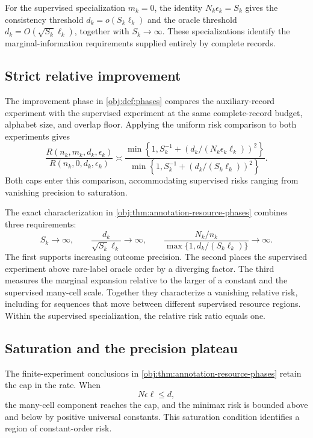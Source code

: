 For the supervised specialization \(m_k=0\), the identity \(N_k\epsilon_k=S_k\) gives the consistency threshold \(d_k=o(S_k\ell_k)\) and the oracle threshold \(d_k=O(\sqrt{S_k}\ell_k)\), together with \(S_k\to\infty\). These specializations identify the marginal-information requirements supplied entirely by complete records.

\subsection{Strict relative improvement}

The improvement phase in \cref{obj:def:phases} compares the auxiliary-record experiment with the supervised experiment at the same complete-record budget, alphabet size, and overlap floor. Applying the uniform risk comparison to both experiments gives
\[
\frac{R(n_k,m_k,d_k,\epsilon_k)}
     {R(n_k,0,d_k,\epsilon_k)}
\asymp
\frac{
\min\left\{1,S_k^{-1}
+\left(d_k/(N_k\epsilon_k\ell_k)\right)^2\right\}
}{
\min\left\{1,S_k^{-1}
+\left(d_k/(S_k\ell_k)\right)^2\right\}
}.
\]
Both caps enter this comparison, accommodating supervised risks ranging from vanishing precision to saturation.

The exact characterization in \cref{obj:thm:annotation-resource-phases} combines three requirements:
\[
S_k\longrightarrow\infty,
\qquad
\frac{d_k}{\sqrt{S_k}\ell_k}\longrightarrow\infty,
\qquad
\frac{N_k/n_k}
{\max\{1,d_k/(S_k\ell_k)\}}
\longrightarrow\infty.
\]
The first supports increasing outcome precision. The second places the supervised experiment above rare-label oracle order by a diverging factor. The third measures the marginal expansion relative to the larger of a constant and the supervised many-cell scale. Together they characterize a vanishing relative risk, including for sequences that move between different supervised resource regions. Within the supervised specialization, the relative risk ratio equals one.

\subsection{Saturation and the precision plateau}

The finite-experiment conclusions in \cref{obj:thm:annotation-resource-phases} retain the cap in the rate. When
\[
N\epsilon\ell\le d,
\]
the many-cell component reaches the cap, and the minimax risk is bounded above and below by positive universal constants. This saturation condition identifies a region of constant-order risk.


